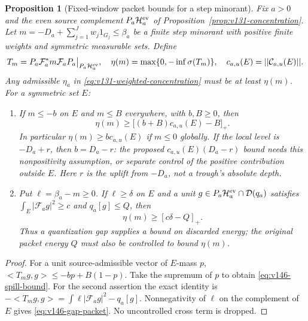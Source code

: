 \documentclass[11pt]{article}
\def\norm#1{||#1||}%
\def\ip#1#2{<#1,#2>}%
\newtheorem{proposition}[theorem]{Proposition}
\theoremstyle{remark}
\newcommand{\norm}[1]{\left\lVert #1\right\rVert}
\newcommand{\ip}[2]{\left\langle #1,#2\right\rangle}
\begin{document}
\begin{proposition}[Fixed-window packet bounds for a step minorant]
\label{prop:v146-packet-loss}
Fix $a>0$ and the even source complement
$P_a\mathcal H_a^{\rm ev}$ of Proposition~\ref{prop:v131-concentration}.
Let $m=-D_a+\sum_{j=1}^Jw_j1_{G_j}\le\beta_a$ be a finite step
minorant with positive finite weights and symmetric measurable sets.
Define
\[
 T_m=P_a\mathcal F_a^*m\mathcal F_aP_a\big|_{P_a\mathcal H_a^{\rm ev}},
 \quad \eta(m)=\max\{0,-\inf\sigma(T_m)\},\quad
 c_{a,u}(E)=\norm{\mathcal C_{a,u}(E)}.
\]
Any admissible $\eta_a$ in \eqref{eq:v131-weighted-concentration}
must be at least $\eta(m)$. For a symmetric set $E$:
\begin{enumerate}
\item If $m\le-b$ on $E$ and $m\le B$ everywhere, with $b,B\ge0$, then
\begin{equation}\label{eq:v146-spill-bound}
 \eta(m)\ge\bigl[(b+B)c_{a,u}(E)-B\bigr]_+.
\end{equation}
In particular $\eta(m)\ge b c_{a,u}(E)$ if $m\le0$ globally.
If the local level is $-D_a+r$, then $b=D_a-r$: the proposed
$c_{a,u}(E)(D_a-r)$ bound needs this nonpositivity assumption, or
separate control of the positive contribution outside $E$. Here $r$
is the uplift from $-D_a$, not a trough's absolute depth.
\item Put $\ell=\beta_a-m\ge0$. If $\ell\ge\delta$ on $E$ and a
unit $g\in P_a\mathcal H_a^{\rm ev}\cap\mathcal D(q_a)$ satisfies
$\int_E|\mathcal F_ag|^2\ge c$ and $q_a[g]\le Q$, then
\begin{equation}\label{eq:v146-gap-packet}
 \eta(m)\ge[c\delta-Q]_+.
\end{equation}
Thus a quantization gap supplies a bound on discarded energy; the
original packet energy $Q$ must also be controlled to bound $\eta(m)$.
\end{enumerate}
\end{proposition}
\begin{proof}
For a unit source-admissible vector of $E$-mass $p$,
$\ip{T_mg}g\le-bp+B(1-p)$. Take the supremum of $p$ to obtain
\eqref{eq:v146-spill-bound}. For the second assertion the exact identity
is $-\ip{T_mg}g=\int\ell|\mathcal F_ag|^2-q_a[g]$.
Nonnegativity of $\ell$ on the complement of $E$ gives
\eqref{eq:v146-gap-packet}. No uncontrolled cross term is dropped.
\end{proof}
\end{document}
